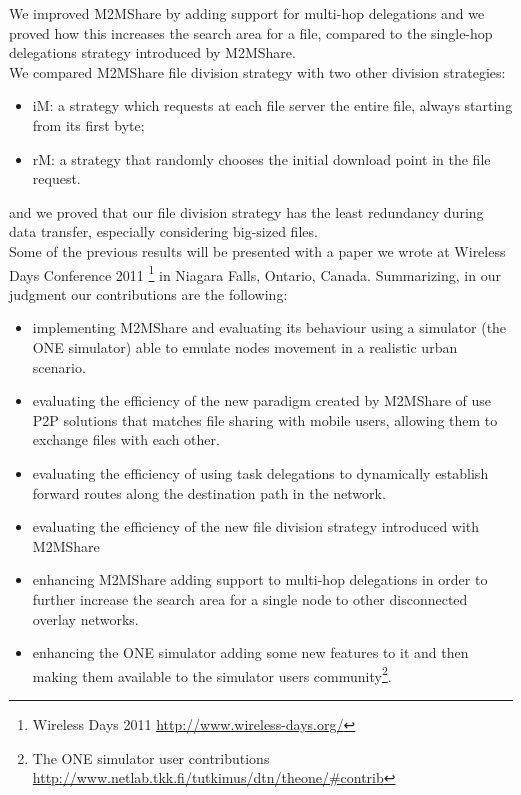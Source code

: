 We improved M2MShare by adding support for multi-hop delegations and we proved how this increases the search area for a file, compared to the single-hop delegations strategy introduced by M2MShare.
\\

We compared M2MShare file division strategy with two other division strategies:
\begin{itemize}
\item iM: a strategy which requests at each file server the entire file, always starting from its first byte;
\item rM: a strategy that randomly chooses the initial download point in the file request.
\end{itemize}
and we proved that our file division strategy has the least redundancy during data transfer, especially considering big-sized files.
\\

Some of the previous results will be presented with a paper we wrote at Wireless Days Conference 2011 \footnote{Wireless Days 2011 \href{http://www.wireless-days.org/}{http://www.wireless-days.org/}} in Niagara Falls, Ontario, Canada.
Summarizing, in our judgment our contributions are the following:
\begin{itemize}
\item implementing M2MShare and evaluating its behaviour using a simulator (the ONE simulator) able to emulate nodes movement in a realistic urban scenario.
\item evaluating the efficiency of the new paradigm created by M2MShare of use P2P solutions that matches file sharing with mobile users, allowing them to exchange files with each other.
\item evaluating the efficiency of using task delegations to dynamically establish forward routes along the destination path in the network.
\item evaluating the efficiency of the new file division strategy introduced with M2MShare 
\item enhancing M2MShare adding support to multi-hop delegations in order to further increase the search area for a single node to other disconnected overlay networks.
\item enhancing the ONE simulator adding some new features to it and then making them available to the simulator users community\footnote{The ONE simulator user contributions \href{http://www.netlab.tkk.fi/tutkimus/dtn/theone/\#contrib}{http://www.netlab.tkk.fi/tutkimus/dtn/theone/\#contrib}}.
\end{itemize}

